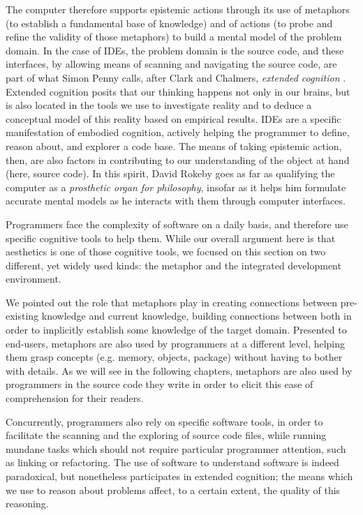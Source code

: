The computer therefore supports epistemic actions through its use of metaphors (to establish a fundamental base of knowledge) and of actions (to probe and refine the validity of those metaphors) to build a mental model of the problem domain. In the case of IDEs, the problem domain is the source code, and these interfaces, by allowing means of scanning and navigating the source code, are part of what Simon Penny calls, after Clark and Chalmers, \emph{extended cognition} \citep{penny_making_2019}. Extended cognition posits that our thinking happens not only in our brains, but is also located in the tools we use to investigate reality and to deduce a conceptual model of this reality based on empirical results. IDEs are a specific manifestation of embodied cognition, actively helping the programmer to define, reason about, and explorer a code base. The means of taking epistemic action, then, are also factors in contributing to our understanding of the object at hand (here, source code). In this spirit, David Rokeby goes as far as qualifying the computer as a \emph{prosthetic organ for philosophy}, insofar as it helps him formulate accurate mental models as he interacts with them through computer interfaces.

Programmers face the complexity of software on a daily basis, and therefore use specific cognitive tools to help them. While our overall argument here is that aesthetics is one of those cognitive tools, we focused on this section on two different, yet widely used kinds: the metaphor and the integrated development environment.

We pointed out the role that metaphors play in creating connections between pre-existing knowledge and current knowledge, building connections between both in order to implicitly establish some knowledge of the target domain. Presented to end-users, metaphors are also used by programmers at a different level, helping them grasp concepts (e.g. memory, objects, package) without having to bother with details. As we will see in the following chapters, metaphors are also used by programmers in the source code they write in order to elicit this ease of comprehension for their readers.

Concurrently, programmers also rely on specific software tools, in order to facilitate the scanning and the exploring of source code files, while running mundane tasks which should not require particular programmer attention, such as linking or refactoring. The use of software to understand software is indeed paradoxical, but nonetheless participates in extended cognition; the means which we use to reason about problems affect, to a certain extent, the quality of this reasoning.

